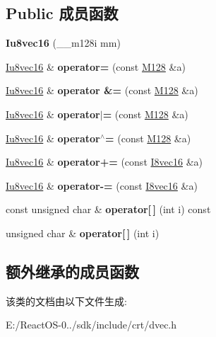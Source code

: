 \subsection*{Public 成员函数}
\begin{DoxyCompactItemize}
\item 
\mbox{\label{class_iu8vec16_a645660afcd322e98eec8f55281f0f2cc}} 
{\bfseries Iu8vec16} (\+\_\+\+\_\+m128i mm)
\item 
\mbox{\label{class_iu8vec16_ab1fe5ca5037ad1499c162971f35b4a39}} 
\hyperlink{class_iu8vec16}{Iu8vec16} \& {\bfseries operator=} (const \hyperlink{class_m128}{M128} \&a)
\item 
\mbox{\label{class_iu8vec16_aa06ef60bd4f1b61c153390d0fe5243bd}} 
\hyperlink{class_iu8vec16}{Iu8vec16} \& {\bfseries operator \&=} (const \hyperlink{class_m128}{M128} \&a)
\item 
\mbox{\label{class_iu8vec16_a1b44861b6f2830fd7d129f07016dbdb4}} 
\hyperlink{class_iu8vec16}{Iu8vec16} \& {\bfseries operator$\vert$=} (const \hyperlink{class_m128}{M128} \&a)
\item 
\mbox{\label{class_iu8vec16_aca3f3e932477bd130c17c51676752c37}} 
\hyperlink{class_iu8vec16}{Iu8vec16} \& {\bfseries operator$^\wedge$=} (const \hyperlink{class_m128}{M128} \&a)
\item 
\mbox{\label{class_iu8vec16_a2005faab5d2ba9e75064d065f6a2d7e1}} 
\hyperlink{class_iu8vec16}{Iu8vec16} \& {\bfseries operator+=} (const \hyperlink{class_i8vec16}{I8vec16} \&a)
\item 
\mbox{\label{class_iu8vec16_a9467143efff48dab9dd706b5c9e91b53}} 
\hyperlink{class_iu8vec16}{Iu8vec16} \& {\bfseries operator-\/=} (const \hyperlink{class_i8vec16}{I8vec16} \&a)
\item 
\mbox{\label{class_iu8vec16_af2eadac9a1a27132d33cac47cd1c4eac}} 
const unsigned char \& {\bfseries operator\mbox{[}$\,$\mbox{]}} (int i) const
\item 
\mbox{\label{class_iu8vec16_adb637e04c7ad3951390984a0588ccdb9}} 
unsigned char \& {\bfseries operator\mbox{[}$\,$\mbox{]}} (int i)
\end{DoxyCompactItemize}
\subsection*{额外继承的成员函数}


该类的文档由以下文件生成\+:\begin{DoxyCompactItemize}
\item 
E\+:/\+React\+O\+S-\/0../sdk/include/crt/dvec.\+h\end{DoxyCompactItemize}
